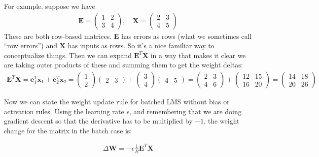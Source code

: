 For example, suppose we have
\begin{eqnarray*}
\mathbf{E} = \begin{pmatrix} 1 & 2 \\ 3 & 4 \end{pmatrix}, \quad \mathbf{X} = \begin{pmatrix} 2 & 3 \\ 4 & 5 \end{pmatrix}
\end{eqnarray*}
These are both row-based matrices. $\mathbf{E}$ has errors as rows (what we sometimes call ``row errors'') and $\mathbf{X}$ has inputs as rows. So it's a nice familiar way to conceptualize things. Then we can expand $\mathbf{E}^T \mathbf{X}$ in a way that makes it clear we are taking outer products of these and summing them to get the weight deltas:
\begin{eqnarray*}
\mathbf{E}^T \mathbf{X} = \mathbf{e}_1^T \mathbf{x}_1 + \mathbf{e}_2^T \mathbf{x}_2 = \begin{pmatrix} 1 \\ 2 \end{pmatrix} \begin{pmatrix} 2 & 3 \end{pmatrix} + \begin{pmatrix} 3 \\ 4 \end{pmatrix} \begin{pmatrix} 4 & 5 \end{pmatrix} = \begin{pmatrix} 2 & 3 \\ 4 & 6 \end{pmatrix} + \begin{pmatrix} 12 & 15 \\ 16 & 20 \end{pmatrix} = \begin{pmatrix} 14 & 18 \\ 20 & 26 \end{pmatrix}
\end{eqnarray*}

Now we can state the weight update rule for batched LMS without bias or activation rules. Using the learning rate $\epsilon$, and remembering that we are doing gradient descent so that the derivative has to be multiplied by $-1$, the weight change for the matrix in the batch case is:

\begin{eqnarray}
\Delta \mathbf{W} =  - \epsilon \frac{1}{B} \mathbf{E}^T \mathbf{X}
\end{eqnarray}
   
